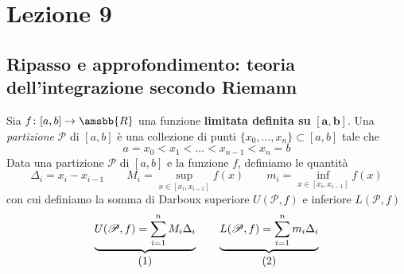 \section{Lezione 9}
\subsection{Ripasso e approfondimento: teoria dell'integrazione secondo Riemann}
\begin{definition}
    \label{def:8.1}
    Sia $f\colon[a,b]\to\amsbb{R}$ una funzione \textbf{limitata definita su} $\mathbf{[a,b]}$. Una \emph{partizione} $\mathscr{P}$ di $[a,b]$ è una collezione di punti $\{x_0, \dots, x_n\}\subset [a,b]$ tale che
    \[
    a=x_0 < x_1 < \dots < x_{n-1}<x_n= b
    \]
    Data una partizione $\mathscr{P}$ di $[a,b]$ e la funzione $f$, definiamo le quantità
    \begin{equation}
        \label{eq:8.1}
        \Delta_i = x_i - x_{i-1} \qquad M_i = \sup_{x\in[x_i, x_{i-1}]} f(x) \qquad m_i = \inf_{x\in[x_i, x_{i-1}]} f(x)
    \end{equation}
    con cui definiamo la somma di Darboux superiore $U(\mathscr{P}, f)$ e inferiore $L(\mathscr{P},f)$
    \[
    \underbrace{U(\mathscr{P},f) = \sum_{i=1}^n M_i \Delta_i}_{\stepcounter{equation}\mbox{(\theequation)}} \qquad \underbrace{L(\mathscr{P},f) = \sum_{i=1}^n m_i \Delta_i}_{\stepcounter{equation}\mbox{(\theequation)}}
    \]
    \addtocounter{equation}{-2}\label{eq:8.2}
    \addtocounter{equation}{0}\label{eq:8.3}
\end{definition}
